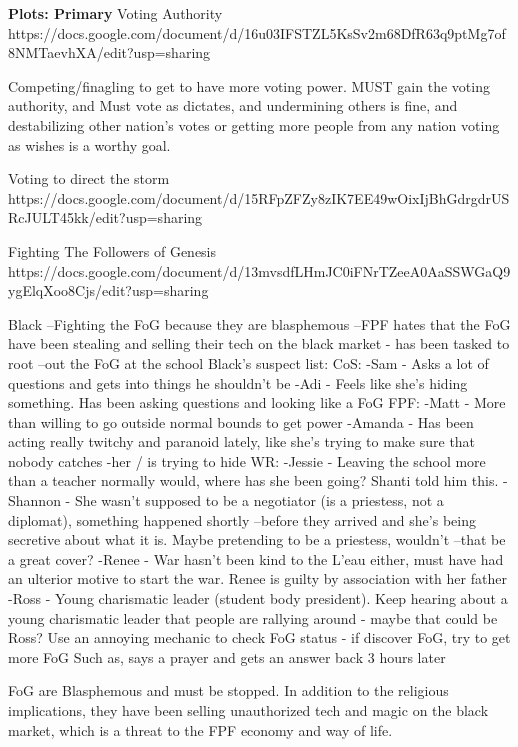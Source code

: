 \documentclass[char]{GL2020}
\begin{document}
\textbf{Plots: Primary}
Voting Authority
https://docs.google.com/document/d/16u03IFSTZL5KsSv2m68DfR63q9ptMg7of8NMTaevhXA/edit?usp=sharing

Competing/finagling to get to have more voting power.  \cScholarship{} MUST gain the voting authority, and Must vote as \cAntiChup{} dictates, and undermining others is fine, and destabilizing other nation's votes or getting more people from any nation voting as \cAntiChup{} wishes is a worthy goal.

Voting to direct the storm
https://docs.google.com/document/d/15RFpZFZy8zIK7EE49wOixIjBhGdrgdrUSRcJULT45kk/edit?usp=sharing

Fighting The Followers of Genesis
https://docs.google.com/document/d/13mvsdfLHmJC0iFNrTZeeA0AaSSWGaQ9ygElqXoo8Cjs/edit?usp=sharing

Black
--Fighting the FoG because they are blasphemous
--FPF hates that the FoG have been stealing and selling their tech on the black market - has been tasked to root --out the FoG at the school 
Black’s suspect list:
CoS:
-Sam - Asks a lot of questions and gets into things he shouldn’t be
-Adi  - Feels like she’s hiding something. Has been asking questions and looking like a FoG
FPF:
-Matt \cAmbition{} - More than willing to go outside normal bounds to get power
-Amanda - Has been acting really twitchy and paranoid lately, like she’s trying to make sure that nobody catches -her / is trying to hide
WR:
-Jessie - Leaving the school more than a teacher normally would, where has she been going?  Shanti told him this.
-Shannon - She wasn’t supposed to be a negotiator (is a priestess, not a diplomat), something happened shortly --before they arrived and she’s being secretive about what it is.  Maybe pretending to be a priestess, wouldn’t --that be a great cover?
-Renee - War hasn’t been kind to the L’eau either, must have had an ulterior motive to start the war.  Renee is guilty by association with her father 
-Ross - Young charismatic leader (student body president).  Keep hearing about a young charismatic leader that people are rallying around - maybe that could be Ross?
Use an annoying mechanic to check FoG status - if discover FoG, try to get more FoG
Such as, says a prayer and gets an answer back 3 hours later


FoG are Blasphemous and must be stopped.  In addition to the religious implications, they have been selling unauthorized tech and magic on the black market, which is a threat to the FPF economy and way of life.
\end{document}
